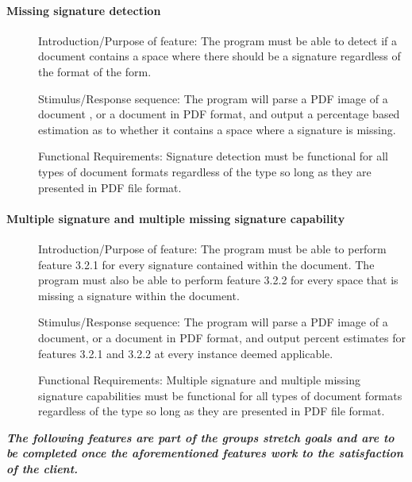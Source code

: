 \documentclass[article, onecolumn, draftclsnofoot,10pt, compsoc]{IEEEtran}
\begin{document}
\paragraph{Missing signature detection}\vspace{.5cm}
\begin{description}
\item [] Introduction/Purpose of feature: The program must be able to detect if a document contains a space where there should be a signature regardless of the format of the form.
\item [] Stimulus/Response sequence: The program will parse a PDF image of a document , or a document in PDF format, and output a percentage based estimation as to whether it contains a space where a signature is missing.
\item [] Functional Requirements: Signature detection must be functional for all types of document formats regardless of the type so long as they are presented in PDF file format. 
\end{description}

\paragraph{Multiple signature and multiple missing signature capability}\vspace{.5cm}
\begin{description}
\item [] Introduction/Purpose of feature: The program must be able to perform feature 3.2.1 for every signature contained within the document. The program must also be able to perform feature 3.2.2 for every space that is missing a signature within the document.
\item [] Stimulus/Response sequence: The program will parse a PDF image of a document, or a document in PDF format, and output percent estimates for features 3.2.1 and 3.2.2 at every instance deemed applicable. 
\item [] Functional Requirements: Multiple signature and multiple missing signature capabilities must be functional for all types of document formats regardless of the type so long as they are presented in PDF file format.
\end{description}

\vspace{.75cm}
\textbf{\textit{The following features are part of the groups stretch goals and are to be completed once the aforementioned features work to the satisfaction of the client. 
}}
\vspace{.75cm}
\end{document}
